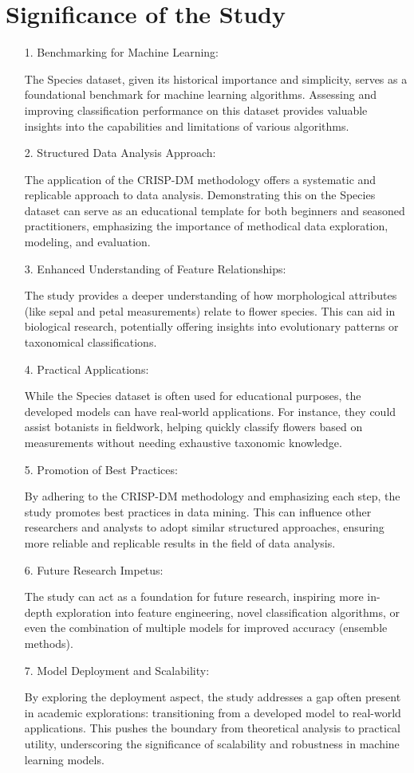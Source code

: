 \documentclass{article}
\begin{document}
\section{Significance of the Study}
\begin{itemize}
    \item[1.] Benchmarking for Machine Learning:
    
    The Species dataset, given its historical importance and simplicity, serves as a foundational benchmark for machine learning algorithms. Assessing and improving classification performance on this dataset provides valuable insights into the capabilities and limitations of various algorithms.
    \item[2.] Structured Data Analysis Approach:
    
    The application of the CRISP-DM methodology offers a systematic and replicable approach to data analysis. Demonstrating this on the Species dataset can serve as an educational template for both beginners and seasoned practitioners, emphasizing the importance of methodical data exploration, modeling, and evaluation.
    \item[3.] Enhanced Understanding of Feature Relationships:

The study provides a deeper understanding of how morphological attributes (like sepal and petal measurements) relate to flower species. This can aid in biological research, potentially offering insights into evolutionary patterns or taxonomical classifications.
    \item[4.]Practical Applications:

While the Species dataset is often used for educational purposes, the developed models can have real-world applications. For instance, they could assist botanists in fieldwork, helping quickly classify flowers based on measurements without needing exhaustive taxonomic knowledge.
    \item[5.]Promotion of Best Practices:

By adhering to the CRISP-DM methodology and emphasizing each step, the study promotes best practices in data mining. This can influence other researchers and analysts to adopt similar structured approaches, ensuring more reliable and replicable results in the field of data analysis.
    \item[6.]Future Research Impetus:

The study can act as a foundation for future research, inspiring more in-depth exploration into feature engineering, novel classification algorithms, or even the combination of multiple models for improved accuracy (ensemble methods).
    \item[7.]Model Deployment and Scalability:

By exploring the deployment aspect, the study addresses a gap often present in academic explorations: transitioning from a developed model to real-world applications. This pushes the boundary from theoretical analysis to practical utility, underscoring the significance of scalability and robustness in machine learning models.
\end{itemize}
\end{document}
